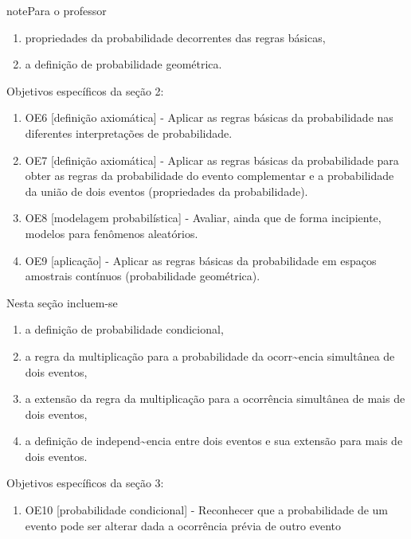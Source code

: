 \begin{sphinxadmonition}{note}{Para o professor}
\begin{enumerate}
\begin{enumerate}
\item {} 
propriedades da probabilidade decorrentes das regras básicas,

\item {} 
a definição de probabilidade geométrica.

\end{enumerate}

Objetivos específicos da seção 2:
\begin{enumerate}
\item {} 
OE6 {[}definição axiomática{]} - Aplicar as regras básicas da probabilidade nas diferentes interpretações de probabilidade.

\item {} 
OE7 {[}definição axiomática{]} - Aplicar as regras básicas da probabilidade para obter as regras da probabilidade do evento complementar e a probabilidade da união de dois eventos (propriedades da probabilidade).

\item {} 
OE8 {[}modelagem probabilística{]} - Avaliar, ainda que de forma incipiente, modelos para fenômenos aleatórios.

\item {} 
OE9 {[}aplicação{]} - Aplicar as regras básicas da probabilidade em espaços amostrais contínuos (probabilidade geométrica).

\end{enumerate}


Nesta seção incluem-se
\begin{enumerate}
\item {} 
a definição de probabilidade condicional,

\item {} 
a regra da multiplicação para a probabilidade da ocorr\textasciitilde{}encia simultânea de dois eventos,

\item {} 
a extensão da regra da multiplicação para a ocorrência simultânea de mais de dois eventos,

\item {} 
a definição de independ\textasciitilde{}encia entre dois eventos e sua extensão para mais de dois eventos.

\end{enumerate}

Objetivos específicos da seção 3:
\begin{enumerate}
\item {} 
OE10 {[}probabilidade condicional{]} - Reconhecer que a probabilidade de um evento pode ser alterar dada a ocorrência prévia de outro evento


\end{enumerate}
\end{enumerate}
\end{sphinxadmonition}
